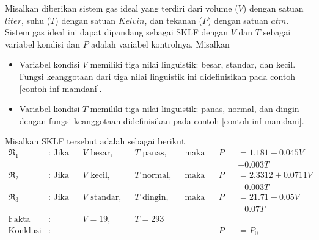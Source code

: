 \begin{contoh}
Misalkan diberikan sistem gas ideal yang terdiri dari volume ($V$) dengan satuan $liter$, suhu ($T$) dengan satuan $Kelvin$, dan tekanan ($P$) dengan satuan $atm$. Sistem gas ideal ini dapat dipandang sebagai SKLF dengan $V$ dan $T$ sebagai variabel kondisi dan $P$ adalah variabel kontrolnya. Misalkan
\begin{itemize}
    \item Variabel kondisi $V$ memiliki tiga nilai linguistik: besar, standar, dan kecil. Fungsi keanggotaan dari tiga nilai linguistik ini didefinisikan pada contoh \ref{contoh inf mamdani}.
    \item Variabel kondisi $T$ memiliki tiga nilai linguistik: panas, normal, dan dingin dengan fungsi keanggotaan didefinisikan pada contoh \ref{contoh inf mamdani}.
\end{itemize}

Misalkan SKLF tersebut adalah sebagai berikut
\begin{align*}
\Re_1 &: \text{ Jika} && V \text{ besar,} && T \text{ panas,}&&\text{maka}&&P&&= \num{1,181} - \num{0,045}V\\
 & && && && && && + \num{0,003}T\\
\Re_2 &: \text{ Jika} && V \text{ kecil,} && T \text{ normal,}&&\text{maka}&&P&&= \num{2,3312} + \num{0,0711}V\\
 & && && && && && - \num{0,003}T\\
\Re_3 &: \text{ Jika} && V \text{ standar,} && T \text{ dingin,}&&\text{maka}&&P&&= \num{21,71} - \num{0,05}V\\
 & && && && && && - \num{0,07}T\\
\text{Fakta} &: && V = 19\text{,} && T = 293\\
\hline
\text{Konklusi} &: && && && && P &&= P_0
\end{align*}


\end{contoh}

